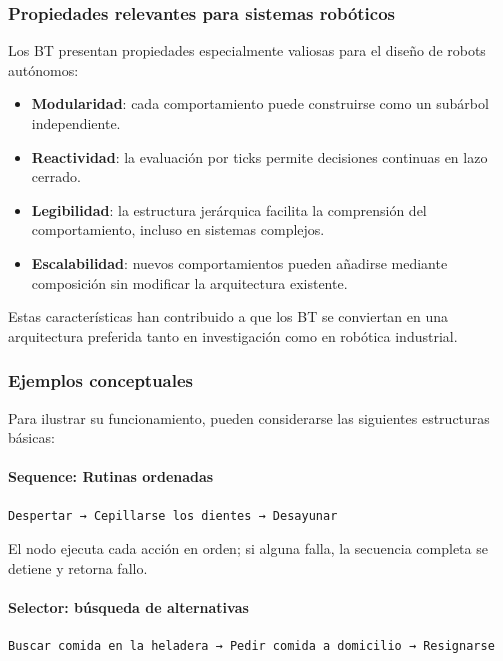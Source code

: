 \documentclass{prgrado}
\begin{document}
\subsubsection{Propiedades relevantes para sistemas robóticos}

Los BT presentan propiedades especialmente valiosas para el diseño de robots autónomos:

\begin{itemize}
    \item \textbf{Modularidad}: cada comportamiento puede construirse como un subárbol independiente.
    \item \textbf{Reactividad}: la evaluación por ticks permite decisiones continuas en lazo cerrado.
    \item \textbf{Legibilidad}: la estructura jerárquica facilita la comprensión del comportamiento, incluso en sistemas complejos.
    \item \textbf{Escalabilidad}: nuevos comportamientos pueden añadirse mediante composición sin modificar la arquitectura existente.
\end{itemize}

Estas características han contribuido a que los BT se conviertan en una arquitectura preferida tanto en investigación como en robótica industrial.

\subsubsection{Ejemplos conceptuales}

Para ilustrar su funcionamiento, pueden considerarse las siguientes estructuras básicas:

\paragraph{Sequence: Rutinas ordenadas}

\begin{verbatim}
Despertar → Cepillarse los dientes → Desayunar
\end{verbatim}

El nodo ejecuta cada acción en orden; si alguna falla, la secuencia completa se detiene y retorna fallo.

\paragraph{Selector: búsqueda de alternativas}

\begin{verbatim}
Buscar comida en la heladera → Pedir comida a domicilio → Resignarse
\end{verbatim}
\end{document}
